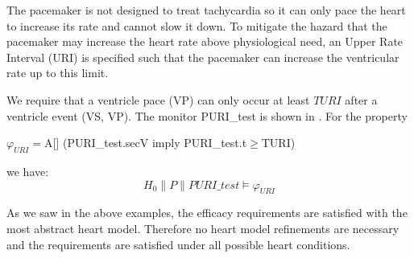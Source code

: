 The pacemaker is not designed to treat tachycardia so it can only pace the heart to increase its rate and cannot slow it down. To mitigate the hazard that the pacemaker may increase the heart rate above physiological need, an Upper Rate Interval (URI) is specified such that the pacemaker can increase the ventricular rate up to this limit. 
  
We require that a ventricle pace (VP) can only occur at least $TURI$ after a ventricle event (VS, VP). The monitor \textsf{PURI\_test} is shown in . For the property
\begin{center}
$\varphi_{URI}=$\textsf{A[] (PURI\_test.secV imply PURI\_test.t$\geq$TURI)}
\end{center}
we have: $$H_0\| P\| PURI\_test\models \varphi_{URI}$$

As we saw in the above examples, the efficacy requirements are satisfied with the most abstract heart model.
Therefore no heart model refinements are necessary and the requirements are satisfied under all possible heart conditions.

